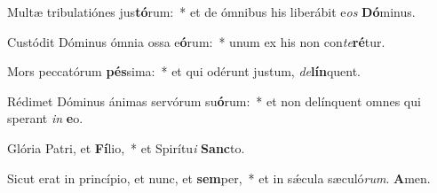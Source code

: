 \item Multæ tribulatiónes jus\textbf{tó}\-rum:~* et de ómnibus his liberábit e\textit{os} \textbf{Dó}minus.
\item Custódit Dóminus ómnia ossa e\textbf{ó}rum:~* unum ex his non con\textit{te}\textbf{ré}tur.
\item Mors peccatórum \textbf{pés}sima:~* et qui odérunt justum, \textit{de}\textbf{lín}quent.
\item Rédimet Dóminus ánimas servórum su\textbf{ó}rum:~* et non delínquent omnes qui sperant \textit{in} \textbf{e}o.
\item Glória Patri, et \textbf{Fí}lio,~* et Spirítu\textit{i} \textbf{Sanc}to.
\item Sicut erat in princípio, et nunc, et \textbf{sem}per,~* et in sǽcula sæculó\textit{rum}. \textbf{A}men.
